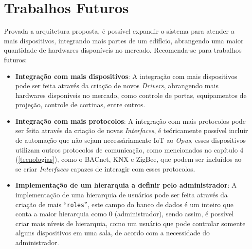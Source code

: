\chapter{Trabalhos Futuros}
\label{trabalhos_futuros}

Provada a arquitetura proposta, é possível expandir o sistema para atender a mais dispositivos, integrando mais partes de um edifício, abrangendo uma
maior quantidade de hardwares disponíveis no mercado.
Recomenda-se para trabalhos futuros:
\begin{itemize}
    \item \textbf{Integração com mais dispositivos}: A integração com mais dispositivos pode ser feita através da criação de novos \emph{Drivers}, 
    abrangendo mais hardwares disponíveis no mercado, como controle de portas, equipamentos de projeção, controle de cortinas, entre outros.
    \item \textbf{Integração com mais protocolos}: A integração com mais protocolos pode ser feita através da criação de novas \emph{Interfaces},
    é teóricamente possível incluir de automação que não sejam necessáriamente IoT ao \emph{Opus}, esses dispositivos utilizam outros protocolos de comunicação,
    como mencionados no capítulo 4 (\ref{tecnologias}), como o BACnet, KNX e ZigBee, que podem ser incluídos ao se criar \emph{Interfaces} capazes de interagir
    com esses protocolos.
    \item \textbf{Implementação de um hierarquia a definir pelo administrador}: A implementação de uma hierarquia de usuários pode ser feita através da criação
    de mais ``\lstinline{roles}'', este campo do banco de dados é um inteiro que conta a maior hierarquia como 0 (administrador), sendo assim, é possível criar
    mais níveis de hierarquia, como um usuário que pode controlar somente alguns dispositivos em uma sala, de acordo com a necessidade do administrador.
\end{itemize}